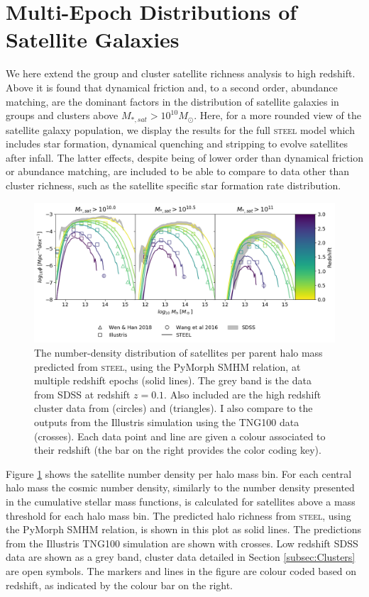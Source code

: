 \section{Multi-Epoch Distributions of Satellite Galaxies}

We here extend the group and cluster satellite richness analysis to high redshift. Above it is found that dynamical friction and, to a second order, abundance matching, are the dominant factors in the distribution of satellite galaxies in groups and clusters above $M_{*,sat} > 10^{10} M_{\odot}$. Here, for a more rounded view of the satellite galaxy population, we display the results for the full \textsc{steel} model which includes star formation, dynamical quenching and stripping to evolve satellites after infall. The latter effects, despite being of lower order than dynamical friction or abundance matching, are included to be able to compare to data other than cluster richness, such as the satellite specific star formation rate distribution.

\begin{figure}[h]
	\centering
	\includegraphics[width = \linewidth]{Figures/Chapter3/HighzClusters.png}
    \caption{The number-density distribution of satellites per parent halo mass predicted from \textsc{steel}, using the PyMorph SMHM relation, at multiple redshift epochs (solid lines). The grey band is the data from SDSS at redshift $z=0.1$. Also included are the high redshift cluster data from \citet{Wang2016DISCOVERY2.506} (circles) and \citet{Wen2018ARedshifts} (triangles). I also compare to the outputs from the Illustris simulation using the TNG100 data (crosses). Each data point and line are given a colour associated to their redshift (the bar on the right provides the color coding key).}
	\label{fig:Sat_Dist_High_z}
\end{figure}

Figure \ref{fig:Sat_Dist_High_z} shows the satellite number density per halo mass bin. For each central halo mass the cosmic number density, similarly to the number density presented in the cumulative stellar mass functions, is calculated for satellites above a mass threshold for each halo mass bin.
The predicted halo richness from \textsc{steel}, using the PyMorph SMHM relation, is shown in this plot as solid lines. The predictions from the Illustris TNG100 simulation \citep{Nelson2018FirstBimodality, Springel2018FirstClustering} are shown with crosses.  Low redshift SDSS data are shown as a grey band, cluster data detailed in Section \ref{subsec:Clusters} are open symbols. The markers and lines in the figure are colour coded based on redshift, as indicated by the colour bar on the right.

